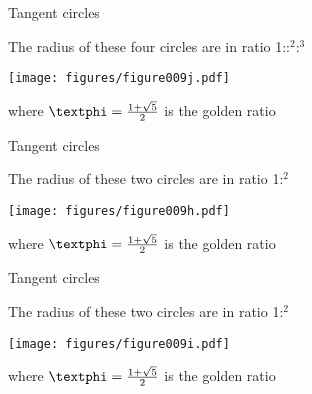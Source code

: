 \documentclass[14pt]{beamer}
\begin{document}

    \begin{frame}{Tangent circles}
        \begin{center}
            The radius of these four circles are in ratio 1:\textphi:\textphi$^2$:\textphi$^3$
        \end{center}\medskip
        \hspace{6.18em} \texttt{[image: figures/figure009j.pdf]} \\
        \begin{center}
             where $\text{\textphi} =\tfrac{1+\sqrt{5}}{2}$ is the golden ratio
        \end{center}
    \end{frame}


    \begin{frame}{Tangent circles}
        \begin{center}
            The radius of these two circles are in ratio 1:\textphi$^2$
        \end{center}\medskip
        \hspace{6.18em} \texttt{[image: figures/figure009h.pdf]} \\
        \begin{center}
             where $\text{\textphi} =\tfrac{1+\sqrt{5}}{2}$ is the golden ratio
        \end{center}
    \end{frame}


    \begin{frame}{Tangent circles}
        \begin{center}
            The radius of these two circles are in ratio 1:\textphi$^2$
        \end{center}\medskip
        \hspace{6.18em} \texttt{[image: figures/figure009i.pdf]} \\
        \begin{center}
             where $\text{\textphi} =\tfrac{1+\sqrt{5}}{2}$ is the golden ratio
        \end{center}
    \end{frame}
\end{document}
